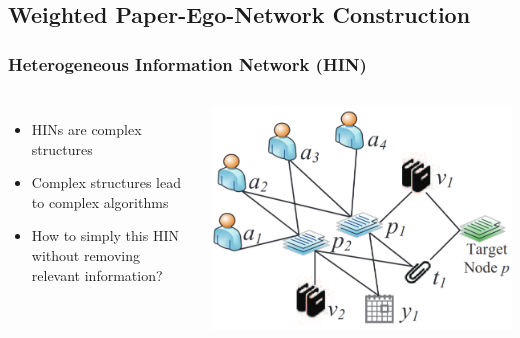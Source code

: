 \subsection{Weighted Paper-Ego-Network Construction}

\begin{frame}
\frametitle{Heterogeneous Information Network (HIN)}
\begin{columns}

\begin{itemize}
    \item HINs are complex structures
    \item Complex structures lead to complex algorithms
    \item How to simply this HIN without removing relevant information?
\end{itemize}

\includegraphics[width=1\linewidth]{img/hin}


\end{columns}
\end{frame}
